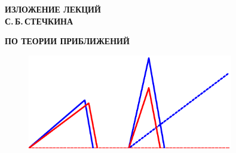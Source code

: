 \documentclass[12pt,twosize,openany]{book}
\begin{document}
\vspace{5cm}

\thispagestyle{empty}
\begin{center}
{\Huge{\textbf{ИЗЛОЖЕНИЕ ЛЕКЦИЙ }}}\\[10pt]

{\Huge{\textbf{С.\,Б.\,СТЕЧКИНА}}}\\[10pt]
\end{center}

{\Huge{\textbf{\hspace{-0.5cm}ПО ТЕОРИИ ПРИБЛИЖЕНИЙ}}}\\[10pt]



\vspace{2cm}

\begin{figure}[ht]
\begin{center}
\includegraphics[width=0.8\textwidth]{pict/moln-2.5.eps}
\end{center}
 \bigskip
 \end{figure}
\end{document}

